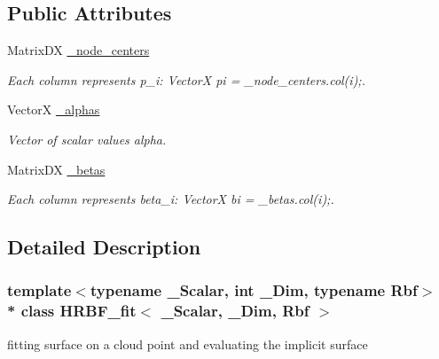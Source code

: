 \subsection*{Public Attributes}
\begin{DoxyCompactItemize}
\item 
Matrix\+DX \hyperlink{classHRBF__fit_aca721d9bee4f4e3da2afe74a7b99bd25}{\+\_\+node\+\_\+centers}\hypertarget{classHRBF__fit_aca721d9bee4f4e3da2afe74a7b99bd25}{}\label{classHRBF__fit_aca721d9bee4f4e3da2afe74a7b99bd25}

\begin{DoxyCompactList}\small\item\em Each column represents p\+\_\+i\+: VectorX pi = \+\_\+node\+\_\+centers.\+col(i);. \end{DoxyCompactList}\item 
VectorX \hyperlink{classHRBF__fit_a146905d5332c833c1d6a9c1bb44ab0c1}{\+\_\+alphas}\hypertarget{classHRBF__fit_a146905d5332c833c1d6a9c1bb44ab0c1}{}\label{classHRBF__fit_a146905d5332c833c1d6a9c1bb44ab0c1}

\begin{DoxyCompactList}\small\item\em Vector of scalar values alpha. \end{DoxyCompactList}\item 
Matrix\+DX \hyperlink{classHRBF__fit_a1867c893d3e24b8d9ae1a07a99bdbde7}{\+\_\+betas}\hypertarget{classHRBF__fit_a1867c893d3e24b8d9ae1a07a99bdbde7}{}\label{classHRBF__fit_a1867c893d3e24b8d9ae1a07a99bdbde7}

\begin{DoxyCompactList}\small\item\em Each column represents beta\+\_\+i\+: VectorX bi = \+\_\+betas.\+col(i);. \end{DoxyCompactList}\end{DoxyCompactItemize}


\subsection{Detailed Description}
\subsubsection*{template$<$typename \+\_\+\+Scalar, int \+\_\+\+Dim, typename Rbf$>$\\*
class H\+R\+B\+F\+\_\+fit$<$ \+\_\+\+Scalar, \+\_\+\+Dim, Rbf $>$}

fitting surface on a cloud point and evaluating the implicit surface 


